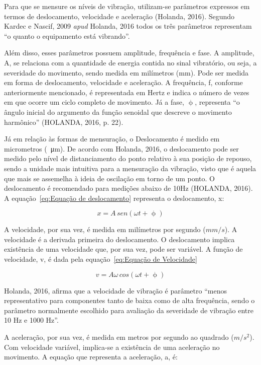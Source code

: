 \documentclass[
	12pt,				
	oneside,			
	a4paper,			
	english,			
	brazil,			
	]{abntex2ppgsi}
\begin{document}
Para que se mensure os níveis de vibração, utilizam-se parâmetros expressos em termos de deslocamento, velocidade e aceleração (Holanda, 2016). Segundo Kardec e Nascif, 2009 \textit{apud} Holanda, 2016 todos os três parâmetros representam “o quanto o equipamento está vibrando”. 

Além disso, esses parâmetros possuem amplitude, frequência e fase. A amplitude, A, se relaciona com a quantidade de energia contida no sinal vibratório, ou seja, a severidade do movimento, sendo medida em milímetros (mm). Pode ser medida em forma de deslocamento, velocidade e aceleração. A frequência, f, conforme anteriormente mencionado, é representada em Hertz e indica o número de vezes em que ocorre um ciclo completo de movimento. Já a fase, $\upphi$, representa “o ângulo inicial do argumento da função senoidal que descreve o movimento harmônico” (HOLANDA, 2016, p. 22).

Já em relação às formas de mensuração, o Deslocamento é medido em micrometros (\SI{}{\micro\metre}). De acordo com Holanda, 2016, o deslocamento pode ser medido pelo nível de distanciamento do ponto relativo à sua posição de repouso, sendo a unidade mais intuitiva para a mensuração da vibração, visto que é aquela que mais se assemelha à ideia de oscilação em torno de um ponto. O deslocamento é recomendado para medições abaixo de 10Hz (HOLANDA, 2016). A equação~\ref{eq:Equação de deslocamento} representa o deslocamento, x:

\begin{equation}
	x = A \,sen (\omega t + \upphi)
	\label{eq:Equação de deslocamento}
\end{equation}

A velocidade, por sua vez, é medida em milímetros por segundo ($mm/s$). A velocidade é a derivada primeira do deslocamento. O deslocamento implica existência de uma velocidade que, por sua vez, pode ser variável. A função de velocidade, v, é dada pela equação~\ref{eq:Equação de Velocidade}

\begin{equation}
	v = A\omega \,cos (\omega t + \upphi)
	\label{eq:Equação de Velocidade}
\end{equation}

Holanda, 2016, afirma que a velocidade de vibração é parâmetro “menos representativo para componentes tanto de baixa como de alta frequência, sendo o parâmetro normalmente escolhido para avaliação da severidade de vibração entre 10 Hz e 1000 Hz”.

A aceleração, por sua vez, é medida em metros por segundo ao quadrado ($m/s^{2}$). Com velocidade variável, implica-se a existência de uma aceleração no movimento. A equação que representa a aceleração, a, é:
\end{document}
